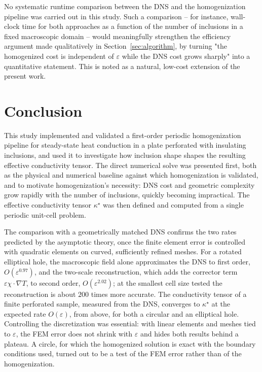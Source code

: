 \documentclass{article}
\makeatletter
\providecommand\FloatBarrier{\par\begingroup\let\@elt\relax
  \edef\@tempa{\@botlist\@deferlist\@dbldeferlist}%
  \ifx\@tempa\@empty\else\clearpage\fi\endgroup}
\makeatother
\begin{document}
No systematic runtime comparison between the DNS and the homogenization
pipeline was carried out in this study. Such a comparison -- for instance,
wall-clock time for both approaches as a function of the number of
inclusions in a fixed macroscopic domain -- would meaningfully strengthen
the efficiency argument made qualitatively in Section~\ref{sec:algorithm}, by turning "the
homogenized cost is independent of $\varepsilon$ while the DNS cost grows
sharply" into a quantitative statement. This is noted as a natural, low-cost
extension of the present work.

\FloatBarrier
\section{Conclusion}

This study implemented and validated a first-order periodic homogenization
pipeline for steady-state heat conduction in a plate perforated with
insulating inclusions, and used it to investigate how inclusion shape shapes
the resulting effective conductivity tensor. The direct numerical solve was
presented first, both as the physical and numerical baseline against which
homogenization is validated, and to motivate homogenization's necessity:
DNS cost and geometric complexity grow rapidly with the number of
inclusions, quickly becoming impractical. The effective conductivity tensor
$\kappa^{\star}$ was then defined and computed from a single periodic
unit-cell problem.

The comparison with a geometrically matched DNS confirms the two rates
predicted by the asymptotic theory, once the finite element error is
controlled with quadratic elements on curved, sufficiently refined meshes. For
a rotated elliptical hole, the macroscopic field alone approximates the DNS to
first order, $O(\varepsilon^{0.97})$, and the two-scale reconstruction, which adds
the corrector term $\varepsilon \chi \cdot \nabla T$, to second order,
$O(\varepsilon^{2.02})$; at the smallest cell size tested the reconstruction is
about $200$ times more accurate. The conductivity tensor of a finite perforated
sample, measured from the DNS, converges to $\kappa^{\star}$ at the expected rate
$O(\varepsilon)$, from above, for both a circular and an elliptical hole.
Controlling the discretization was essential: with linear elements and meshes
tied to $\varepsilon$, the FEM error does not shrink with $\varepsilon$ and hides both
results behind a plateau. A circle, for which the homogenized solution is exact
with the boundary conditions used, turned out to be a test of the FEM error
rather than of the homogenization.
\end{document}
